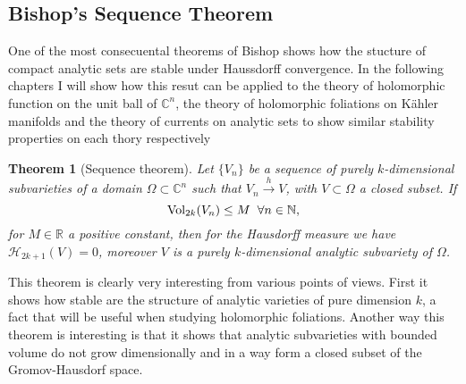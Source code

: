 \documentclass[12pt,twoside,a4paper]{report}
\newtheorem{theorem}{Theorem}[section]
\newcommand{\nat}{\ensuremath{ \mathbb N }}
\newcommand{\re}{\ensuremath{\mathbb R }}
\newcommand{\con}{\ensuremath{\mathbb{C}^n}}
\begin{document}
\subsection{Bishop's Sequence Theorem}
\noindent One of the most consecuental theorems of Bishop shows how the stucture of compact analytic sets are stable under Haussdorff convergence. In the following chapters I will show how this resut can be applied to the theory of holomorphic function on the unit ball of $\con$, the theory of holomorphic foliations on Kähler manifolds and the theory of currents on analytic sets to show similar stability properties on each thory respectively

\begin{theorem}[Sequence theorem] \label{bishop sequence}
  Let $\lbrace V_n\rbrace$ be a sequence of purely $k$-dimensional subvarieties of a domain $\Omega\subset\con$ such that $V_n\overset{h}\rightarrow V$, with $V\subset\Omega$ a closed subset. If
  \[
    \textrm{Vol}_{2k}(V_n)\leq M \hspace*{0.2cm}\forall n\in\nat,
  \]
  for $M\in\re$ a positive constant, then for the Hausdorff measure we have $\mathcal{H}_{2k+1}(V)=0$, moreover $V$ is a purely $k$-dimensional analytic subvariety of $\Omega$.
\end{theorem}

This theorem is clearly very interesting from various points of views. First it shows how stable are the structure of analytic varieties of pure dimension $k$, a fact that will be useful when studying holomorphic foliations. Another way this theorem is interesting is that it shows that analytic subvarieties with bounded volume do not grow dimensionally and in a way form a closed subset of the Gromov-Hausdorf space.
\end{document}
